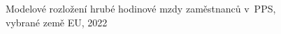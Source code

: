 \def\strEuMzdaDistribuceMediany{\acs{geo-CZ}~\SI{10{,}55}{\pps\per\hour}; \acs{geo-SK}~\SI{10{,}18}{\pps\per\hour}; \acs{geo-PL}~\SI{12{,}09}{\pps\per\hour}; \acs{geo-AT}~\SI{16{,}10}{\pps\per\hour}; \acs{geo-DE}~\SI{17{,}36}{\pps\per\hour}; \acs{geo-DK}~\SI{22{,}85}{\pps\per\hour}}%
\def\strEuMzdaDistribuceCaption{Modelové rozložení hrubé hodinové mzdy zaměstnanců v~\acs{PPS}, vybrané země EU, 2022}%
%
\begin{figure}[htbp]
  \centering
  \resizebox{0.95\linewidth}{!}{}
  \caption{\strEuMzdaDistribuceCaption}
  \label{fig:eu_mzda_distribuce}
\end{figure}
